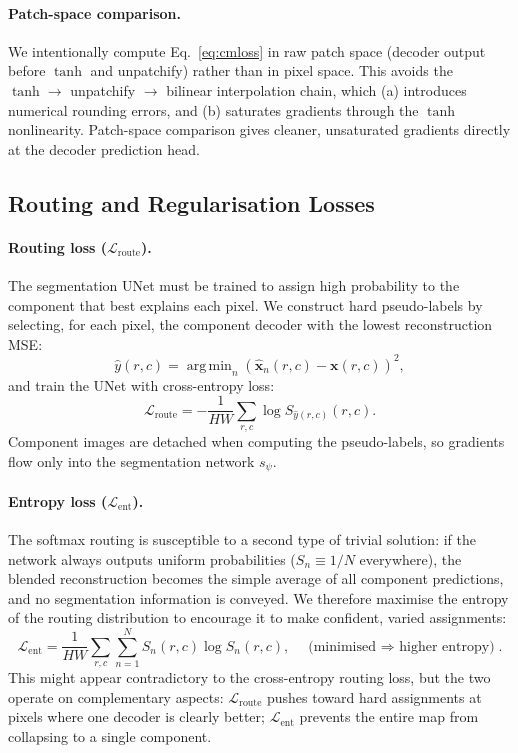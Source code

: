 \documentclass{article}
\DeclareMathOperator*{\argmin}{arg\,min}
\newcommand{\bx}{\mathbf{x}}
\begin{document}
\paragraph{Patch-space comparison.}
We intentionally compute Eq.~\ref{eq:cmloss} in raw patch space (decoder output
before $\tanh$ and unpatchify) rather than in pixel space.  This avoids the
$\tanh \to$ unpatchify $\to$ bilinear interpolation chain, which (a) introduces
numerical rounding errors, and (b) saturates gradients through the $\tanh$
nonlinearity.  Patch-space comparison gives cleaner, unsaturated gradients directly
at the decoder prediction head.

\subsection{Routing and Regularisation Losses}
\label{sec:routing}

\paragraph{Routing loss ($\mathcal{L}_\mathrm{route}$).}
The segmentation UNet must be trained to assign high probability to the component
that best explains each pixel.  We construct hard pseudo-labels by selecting, for
each pixel, the component decoder with the lowest reconstruction MSE:
\begin{equation}
  \hat{y}(r,c) = \argmin_{n} \left(\hat{\bx}_n(r,c) - \bx(r,c)\right)^2,
\end{equation}
and train the UNet with cross-entropy loss:
\begin{equation}
  \mathcal{L}_\mathrm{route} = -\frac{1}{HW} \sum_{r,c}
  \log S_{\hat{y}(r,c)}(r,c).
\end{equation}
Component images are detached when computing the pseudo-labels, so gradients flow
only into the segmentation network $s_\psi$.

\paragraph{Entropy loss ($\mathcal{L}_\mathrm{ent}$).}
The softmax routing is susceptible to a second type of trivial solution: if the
network always outputs uniform probabilities ($S_n \equiv 1/N$ everywhere), the
blended reconstruction becomes the simple average of all component predictions, and
no segmentation information is conveyed.  We therefore maximise the entropy of the
routing distribution to encourage it to make confident, varied assignments:
\begin{equation}
  \mathcal{L}_\mathrm{ent} = \frac{1}{HW}\sum_{r,c}
  \sum_{n=1}^{N} S_n(r,c) \log S_n(r,c),
  \quad \text{(minimised $\Rightarrow$ higher entropy)}.
\end{equation}
This might appear contradictory to the cross-entropy routing loss, but the two
operate on complementary aspects: $\mathcal{L}_\mathrm{route}$ pushes toward
hard assignments at pixels where one decoder is clearly better; $\mathcal{L}_\mathrm{ent}$
prevents the entire map from collapsing to a single component.
\end{document}
